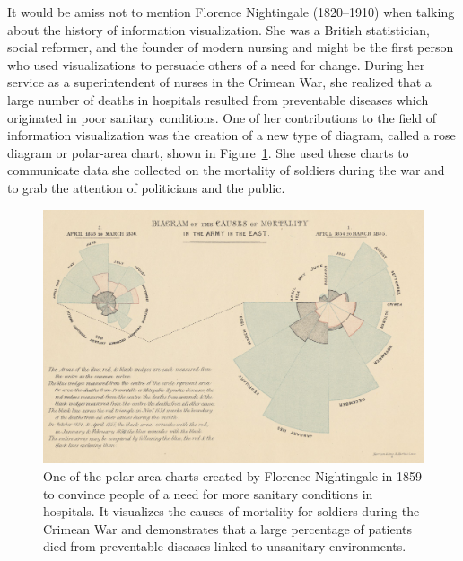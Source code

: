 It would be amiss not to mention Florence Nightingale (1820--1910)
\parencite{FlorenceNightingale} when talking about the history of
information visualization. She was a British statistician, social
reformer, and the founder of modern nursing and might be the first
person who used visualizations to persuade others of a need for
change. During her service as a superintendent of nurses in the
Crimean War, she realized that a large number of deaths in hospitals
resulted from preventable diseases which originated in poor sanitary
conditions. One of her contributions to the field of information
visualization was the creation of a new type of diagram, called a rose
diagram or polar-area chart, shown in
Figure~\ref{fig:NightingalePolarAreaChart}. She used these charts to
communicate data she collected on the mortality of soldiers during the
war and to grab the attention of politicians and the public.

\begin{figure}[tp]
\centering
\includegraphics[keepaspectratio,width=\linewidth,height=\thirdh]
{images/nightingale.png}
\caption[Polar-Area Chart by Florence Nightingale from 1859]{%
One of the polar-area charts created by Florence Nightingale in 1859
to convince people of a need for more sanitary conditions in
hospitals. It visualizes the causes of mortality for soldiers during
the Crimean War and demonstrates that a large percentage of patients
died from preventable diseases linked to unsanitary environments.
}
\label{fig:NightingalePolarAreaChart}
\end{figure}




